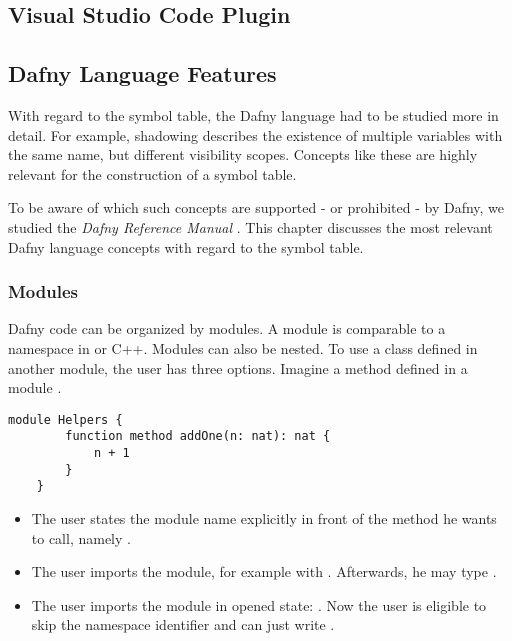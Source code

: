 \subsection{Visual Studio Code Plugin}


\subsection{Dafny Language Features}
With regard to the symbol table, the Dafny language had to be studied more in detail.
For example, shadowing describes the existence of multiple variables with the same name, but different visibility scopes.
Concepts like these are highly relevant for the construction of a symbol table.

To be aware of which such concepts are supported - or prohibited - by Dafny, we studied the \textit{Dafny Reference Manual} \cite{dafnyReferenceManual}.
This chapter discusses the most relevant Dafny language concepts with regard to the symbol table.


\subsubsection{Modules}
Dafny code can be organized by modules.
A module is comparable to a namespace in \CsharpWithSpace or C++.
Modules can also be nested.
To use a class defined in another module, the user has three options.
Imagine a method  defined in a module .

\begin{lstlisting}[language=dafny, caption={Module Example}, captionpos=b, label={lst:addOneMethod}]
    module Helpers {
        function method addOne(n: nat): nat {
            n + 1
        }
    }
\end{lstlisting}

\begin{itemize}
    \item The user states the module name explicitly in front of the method he wants to call, \linebreak namely .
    \item The user imports the module, for example with .
    Afterwards, he may type .
    \item The user imports the module in opened state: .
    Now the user is eligible to skip the namespace identifier and can just write .
\end{itemize}

